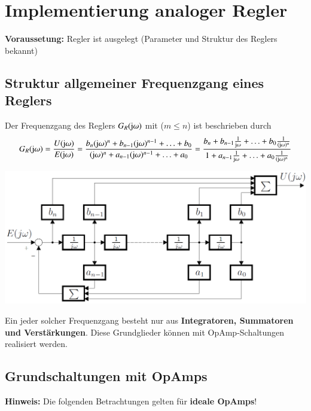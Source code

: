 \section{Implementierung analoger Regler}

\textbf{Voraussetung:} Regler ist ausgelegt (Parameter und Struktur des Reglers bekannt)


\subsection{Struktur allgemeiner Frequenzgang eines Reglers}

Der Frequenzgang des Reglers $G_R(\mathrm{j} \omega)$ mit ($m \leq n$) ist beschrieben durch
$$ G_R(\mathrm{j} \omega) = \frac{U(\mathrm{j} \omega)}{E(\mathrm{j} \omega)} 
    = \frac{b_n (\mathrm{j} \omega)^n + b_{n-1}(\mathrm{j} \omega)^{n-1} + \ldots + b_0}{(\mathrm{j} \omega)^n + a_{n-1}(\mathrm{j} \omega)^{n-1} + \ldots + a_0} 
    = \frac{b_n + b_{n-1} \frac{1}{\mathrm{j} \omega} + \ldots + b_0 \frac{1}{(\mathrm{j} \omega)^n}}{1 + a_{n-1} \frac{1}{\mathrm{j} \omega} + \ldots + a_0 \frac{1}{(\mathrm{j} \omega)^n}} $$

\begin{minipage}[c]{0.55\columnwidth}
    \includegraphics[width=\columnwidth]{images/struktur_allgemeiner_frequenzgang.png}
\end{minipage}
\hfill
\begin{minipage}[c]{0.43\columnwidth}
    Ein jeder solcher Frequenzgang besteht nur aus \textbf{Integratoren, Summatoren und Verstärkungen}. 
    Diese Grundglieder können mit OpAmp-Schaltungen realisiert werden.
\end{minipage}


\subsection{Grundschaltungen mit OpAmps}

\textbf{Hinweis:} Die folgenden Betrachtungen gelten für \textbf{ideale OpAmps}!



